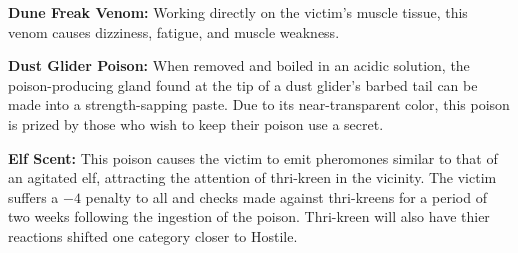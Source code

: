
\textbf{Dune Freak Venom:} Working directly on the victim's muscle tissue, this venom causes dizziness, fatigue, and muscle weakness.

\textbf{Dust Glider Poison:} When removed and boiled in an acidic solution, the poison-producing gland found at the tip of a dust glider's barbed tail can be made into a strength-sapping paste. Due to its near-transparent color, this poison is prized by those who wish to keep their poison use a secret.

\textbf{Elf Scent:} This poison causes the victim to emit pheromones similar to that of an agitated elf, attracting the attention of thri-kreen in the vicinity. The victim suffers a $-4$ penalty to all  and  checks made against thri-kreens for a period of two weeks following the ingestion of the poison. Thri-kreen will also have thier reactions shifted one category closer to Hostile.

